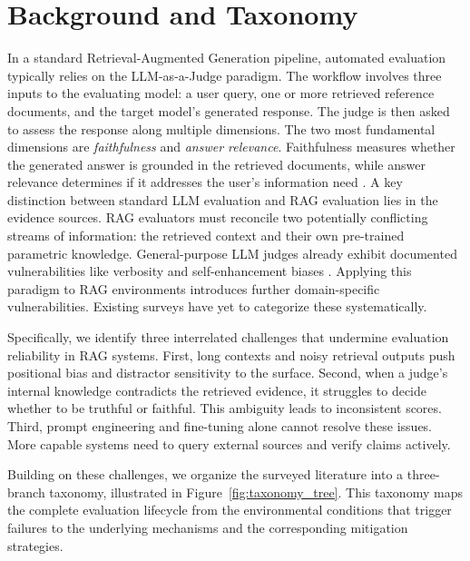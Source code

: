\section{Background and Taxonomy}


In a standard Retrieval-Augmented Generation pipeline, automated evaluation typically relies on the LLM-as-a-Judge paradigm. The workflow involves three inputs to the evaluating model: a user query, one or more retrieved reference documents, and the target model's generated response. The judge is then asked to assess the response along multiple dimensions. The two most fundamental dimensions are \textit{faithfulness} and \textit{answer relevance}. Faithfulness measures whether the generated answer is grounded in the retrieved documents, while answer relevance determines if it addresses the user's information need \citep{Brehme_2025, gu2025surveyllmasajudge}. A key distinction between standard LLM evaluation and RAG evaluation lies in the evidence sources. RAG evaluators must reconcile two potentially conflicting streams of information: the retrieved context and their own pre-trained parametric knowledge. General-purpose LLM judges already exhibit documented vulnerabilities like verbosity and self-enhancement biases \citep{wang2023fair}. Applying this paradigm to RAG environments introduces further domain-specific vulnerabilities. Existing surveys have yet to categorize these systematically.

Specifically, we identify three interrelated challenges that undermine evaluation reliability in RAG systems. First, long contexts and noisy retrieval outputs push positional bias and distractor sensitivity to the surface. Second, when a judge's internal knowledge contradicts the retrieved evidence, it struggles to decide whether to be truthful or faithful. This ambiguity leads to inconsistent scores. Third, prompt engineering and fine-tuning alone cannot resolve these issues. More capable systems need to query external sources and verify claims actively.

Building on these challenges, we organize the surveyed literature into a three-branch taxonomy, illustrated in Figure~\ref{fig:taxonomy_tree}. This taxonomy maps the complete evaluation lifecycle from the environmental conditions that trigger failures to the underlying mechanisms and the corresponding mitigation strategies.

